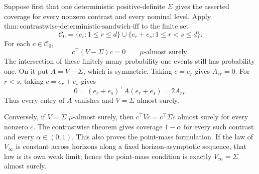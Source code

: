 Suppose first that one deterministic positive-definite \(\Sigma\) gives the asserted coverage for every nonzero contrast and every nominal level.  Apply \(\mathrm{thm:contrastwise\text{-}deterministic\text{-}sandwich\text{-}iff}\) to the finite set
\[
 \mathcal C_0=\{e_r:1\le r\le d\}\cup
 \{e_r+e_s:1\le r<s\le d\}.
\tag{1}
\]
For each \(c\in\mathcal C_0\),
\[
 c^\top(V-\Sigma)c=0\qquad\mu\text{-almost surely}.
\tag{2}
\]
The intersection of these finitely many probability-one events still has probability one.  On it put \(A=V-\Sigma\), which is symmetric.  Taking \(c=e_r\) gives \(A_{rr}=0\).  For \(r<s\), taking \(c=e_r+e_s\) gives
\[
 0=(e_r+e_s)^\top A(e_r+e_s)=2A_{rs}.
\tag{3}
\]
Thus every entry of \(A\) vanishes and \(V=\Sigma\) almost surely.

Conversely, if \(V=\Sigma\) \(\mu\)-almost surely, then \(c^\top Vc=c^\top\Sigma c\) almost surely for every nonzero \(c\).  The contrastwise theorem gives coverage \(1-\alpha\) for every such contrast and every \(\alpha\in(0,1)\).  This also proves the point-mass formulation.  If the law of \(V_\infty\) is constant across horizons along a fixed horizon-asymptotic sequence, that law is its own weak limit; hence the point-mass condition is exactly \(V_\infty=\Sigma\) almost surely.
